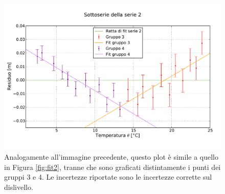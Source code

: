 \begin{figure}[p]
    \centering
    \includegraphics[width=130mm]{immagini/fit2r.pdf}
    \caption{Analogamente all'immagine precedente, questo plot è simile a quello in Figura \ref{fig:fit2},
    tranne che sono graficati distintamente i punti dei gruppi 3 e 4. Le incertezze riportate sono le incertezze
    corrette sul dislivello.}
    \label{fig:fit2r}
\end{figure}
